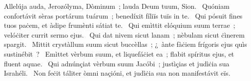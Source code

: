 { Allelúja}
{%
auda, Jerozólyma, Dòminum~; lauda Deum tuum, Sion. 
~Quóniam confortávit sèras portárum tuárum~; benedíxit fíliïs tuïs in te. 
~Qui pósuit fines tuos paċem, et àdipe frumènti sátiat te. 
~Qui emìttit elóquium suum terrae~; velóċiter currit sermo ejus. 
~Qui dat nivem sicut lanam~; nèbulam sicut ċìnerem spargit. 
~Mittit crystàllum suum sicut buccèllas~; ¿~ànte fàċiem frígoris ejus quìs sustinébit~? 
~Emìttet vèrbum suum, et liquefáċiet ea~; flabit spíritus ejus, et fluent aquae. 
~Qui adnúnçiat vèrbum suum Jacóbi~; justìçias et judìċia sua Israhéli. 
~Non feċit táliter òmni naçióni, et judìċia sua non manifestávit eïs. 
}
